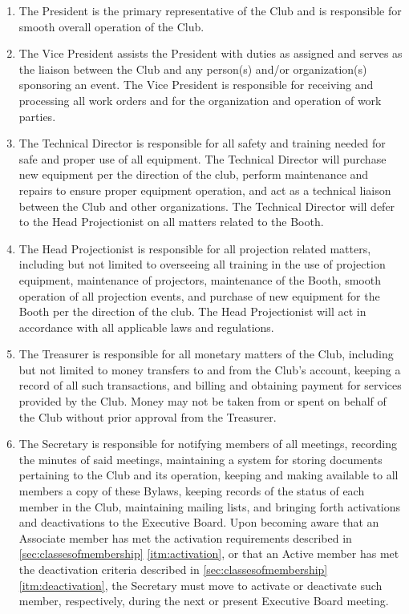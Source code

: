 \documentclass[12pt,letterpaper,oneside]{book}
\begin{document}
\begin{enumerate}

\item The President is the primary representative of the Club and is responsible for smooth overall operation of the Club.
\item The Vice President assists the President with duties as assigned and
    serves as the liaison between the Club and any person(s) and/or organization(s) sponsoring an event. The Vice President is responsible for receiving and processing all work orders and for the organization and operation of work parties.
\item The Technical Director is responsible for all safety and training needed for safe and proper use of all equipment. The Technical Director will purchase new equipment per the direction of the club, perform maintenance and repairs to ensure proper equipment operation, and act as a technical liaison between the Club and other organizations.  The Technical Director will defer to the Head Projectionist on all matters related to the Booth.
\item The Head Projectionist is responsible for all projection related matters, including but not limited to overseeing all training in the use of projection equipment, maintenance of projectors, maintenance of the Booth, smooth operation of all projection events, and purchase of new equipment for the Booth per the direction of the club. The Head Projectionist will act in accordance with all applicable laws and regulations.
\item The Treasurer is responsible for all monetary matters of the Club, including but not limited to money transfers to and from the Club’s account, keeping a record of all such transactions, and billing and obtaining payment for services provided by the Club. Money may not be taken from or spent on behalf of the Club without prior approval from the Treasurer.
\item The Secretary is responsible for notifying members of all meetings, recording the minutes of said meetings, maintaining a system for storing documents pertaining to the Club and its operation, keeping and making available to all members a copy of these Bylaws, keeping records of the status of each member in the Club, maintaining mailing lists, and bringing forth activations and deactivations to the Executive Board. Upon becoming aware that an Associate member has met the activation requirements described in \cref{sec:classesofmembership} \cref{itm:activation}, or that an Active member has met the deactivation criteria described in \cref{sec:classesofmembership} \cref{itm:deactivation}, the Secretary must move to activate or deactivate such member, respectively, during the next or present Executive Board meeting.

\end{enumerate}
\end{document}
